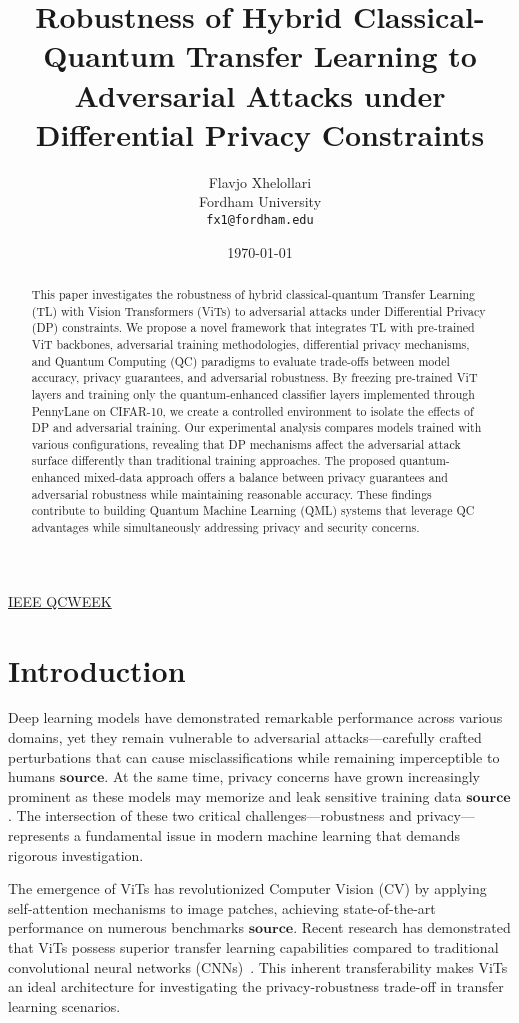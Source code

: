 \documentclass[11pt, conference]{IEEEtran}
\title{Robustness of Hybrid Classical-Quantum Transfer Learning to Adversarial Attacks under Differential Privacy Constraints} %
\author{Flavjo Xhelollari \\ Fordham University \\ \texttt{fx1@fordham.edu}}
\date{\today}
\begin{document}
\maketitle

\begin{abstract}
This paper investigates the robustness of hybrid classical-quantum Transfer Learning (TL) with Vision Transformers (ViTs) to adversarial attacks under Differential Privacy (DP) constraints. We propose a novel framework that integrates TL with pre-trained ViT backbones, adversarial training methodologies, differential privacy mechanisms, and Quantum Computing (QC) paradigms to evaluate trade-offs between model accuracy, privacy guarantees, and adversarial robustness. By freezing pre-trained ViT layers and training only the quantum-enhanced classifier layers implemented through PennyLane on CIFAR-10, we create a controlled environment to isolate the effects of DP and adversarial training. Our experimental analysis compares models trained with various configurations, revealing that DP mechanisms affect the adversarial attack surface differently than traditional training approaches. The proposed quantum-enhanced mixed-data approach offers a balance between privacy guarantees and adversarial robustness while maintaining reasonable accuracy. These findings contribute to building Quantum Machine Learning (QML) systems that leverage QC advantages while simultaneously addressing privacy and security concerns.
\end{abstract}
\sloppy

\href{https://qce.quantum.ieee.org/2025/call-for-technical-papers/}{IEEE QCWEEK}

\section{Introduction}
Deep learning models have demonstrated remarkable performance across various domains, yet they remain vulnerable to adversarial attacks—carefully crafted perturbations that can cause misclassifications while remaining imperceptible to humans  $\textbf{source}$. At the same time, privacy concerns have grown increasingly prominent as these models may  memorize and leak sensitive training data  $\textbf{source}$. The intersection of these two critical challenges—robustness and privacy—represents a fundamental issue in modern machine learning that demands rigorous investigation.

The emergence of ViTs has revolutionized Computer Vision (CV) by applying self-attention mechanisms to image patches, achieving state-of-the-art performance on numerous benchmarks $\textbf{source}$. Recent research has demonstrated that ViTs possess superior transfer learning capabilities compared to traditional convolutional neural networks (CNNs)~\cite{panyi2022transferability}. This inherent transferability makes ViTs an ideal architecture for investigating the privacy-robustness trade-off in transfer learning scenarios.
\end{document}

